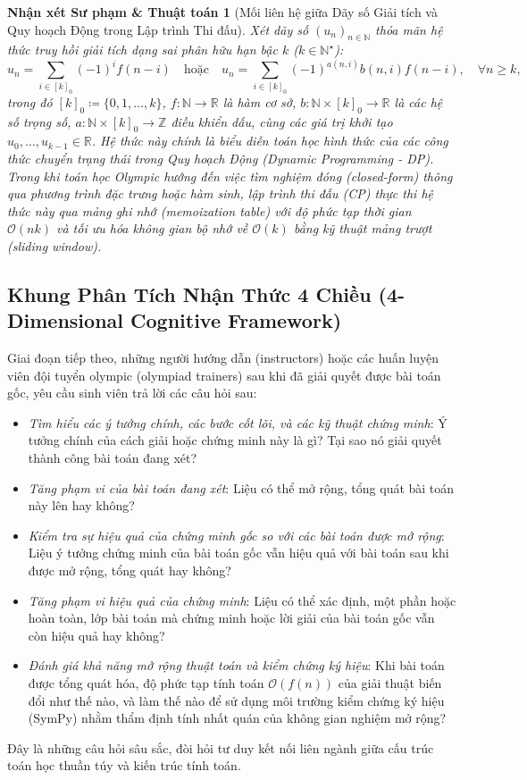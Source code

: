 \documentclass{article}
\newtheorem{nhanxet}{Nhận xét Sư phạm \& Thuật toán}
\begin{document}
\begin{nhanxet}[Mối liên hệ giữa Dãy số Giải tích và Quy hoạch Động trong Lập trình Thi đấu]
Xét dãy số $(u_n)_{n \in \mathbb{N}}$ thỏa mãn hệ thức truy hồi giải tích dạng sai phân hữu hạn bậc $k$ ($k \in \mathbb{N}^\star$):
\begin{equation}
    u_n = \sum_{i \in [k]_0} (-1)^i f(n - i) \quad \text{hoặc} \quad u_n = \sum_{i \in [k]_0} (-1)^{a(n,i)} b(n,i) f(n - i), \quad \forall n \ge k,
\end{equation}
trong đó $[k]_0 \coloneqq \{0, 1, \ldots, k\}$, $f: \mathbb{N} \to \mathbb{R}$ là hàm cơ sở, $b: \mathbb{N} \times [k]_0 \to \mathbb{R}$ là các hệ số trọng số, $a: \mathbb{N} \times [k]_0 \to \mathbb{Z}$ điều khiển dấu, cùng các giá trị khởi tạo $u_0, \ldots, u_{k-1} \in \mathbb{R}$. Hệ thức này chính là biểu diễn toán học hình thức của các công thức chuyển trạng thái trong Quy hoạch Động (Dynamic Programming - DP). Trong khi toán học Olympic hướng đến việc tìm nghiệm đóng (closed-form) thông qua phương trình đặc trưng hoặc hàm sinh, lập trình thi đấu (CP) thực thi hệ thức này qua mảng ghi nhớ (memoization table) với độ phức tạp thời gian $\mathcal{O}(nk)$ và tối ưu hóa không gian bộ nhớ về $\mathcal{O}(k)$ bằng kỹ thuật mảng trượt (sliding window).
\end{nhanxet}

\subsection{Khung Phân Tích Nhận Thức 4 Chiều (4-Dimensional Cognitive Framework)}
Giai đoạn tiếp theo, những người hướng dẫn (instructors) hoặc các huấn luyện viên đội tuyển olympic (olympiad trainers) sau khi đã giải quyết được bài toán gốc, yêu cầu sinh viên trả lời các câu hỏi sau:
\begin{itemize}
	\item \textit{Tìm hiểu các ý tưởng chính, các bước cốt lõi, và các kỹ thuật chứng minh}: Ý tưởng chính của cách giải hoặc chứng minh này là gì? Tại sao nó giải quyết thành công bài toán đang xét?
	\item \textit{Tăng phạm vi của bài toán đang xét}: Liệu có thể mở rộng, tổng quát bài toán này lên hay không?
	\item \textit{Kiểm tra sự hiệu quả của chứng minh gốc so với các bài toán được mở rộng}: Liệu ý tưởng chứng minh của bài toán gốc vẫn hiệu quả với bài toán sau khi được mở rộng, tổng quát hay không?
	\item \textit{Tăng phạm vi hiệu quả của chứng minh}: Liệu có thể xác định, một phần hoặc hoàn toàn, lớp bài toán mà chứng minh hoặc lời giải của bài toán gốc vẫn còn hiệu quả hay không?
	\item \textit{Đánh giá khả năng mở rộng thuật toán và kiểm chứng ký hiệu}: Khi bài toán được tổng quát hóa, độ phức tạp tính toán $\mathcal{O}(f(n))$ của giải thuật biến đổi như thế nào, và làm thế nào để sử dụng môi trường kiểm chứng ký hiệu (\textsf{SymPy}) nhằm thẩm định tính nhất quán của không gian nghiệm mở rộng?
\end{itemize}
Đây là những câu hỏi sâu sắc, đòi hỏi tư duy kết nối liên ngành giữa cấu trúc toán học thuần túy và kiến trúc tính toán.
\end{document}
